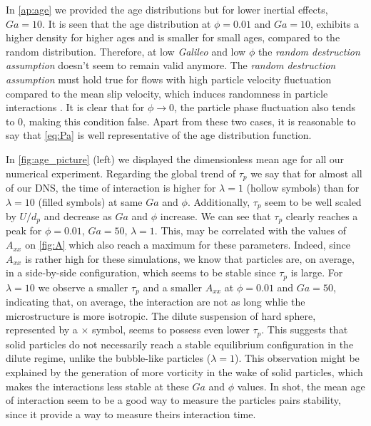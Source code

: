 In \ref{ap:age}  we provided the age distributions but for lower inertial effects, $Ga = 10$. 
It is seen that the age distribution at $\phi = 0.01$ and $Ga = 10$, exhibits a higher density for higher ages and is smaller for small ages, compared to the random distribution.
Therefore, at low \textit{Galileo} and low $\phi$ the \textit{random destruction assumption} doesn't seem to remain valid anymore. 
The \textit{random destruction assumption} must hold true for flows with high particle velocity fluctuation compared to the mean slip velocity, which induces randomness in particle interactions \citep{zhang2023evolution}. 
It is clear that for $\phi \rightarrow 0$, the particle phase fluctuation also tends to $0$, making this condition false. 
Apart from these two cases, it is reasonable to say that \ref{eq:Pa} is well representative of the age distribution function.

In \ref{fig:age_picture} (left) we displayed the dimensionless mean age for all our numerical experiment. 
Regarding the global trend of $\tau_p$ we say that for almost all of our DNS, the time of interaction is higher for $\lambda = 1$ (hollow symbols) than for $\lambda = 10$ (filled symbols) at same $Ga$ and $\phi$.
Additionally,  $\tau_p$ seem to be well scaled by $U/d_p$ and decrease as $Ga$ and $\phi$ increase. 
We can see that $\tau_p$ clearly reaches a peak for $\phi=0.01$, $Ga=50$, $\lambda=1$.
This, may be correlated with the values of $A_{xx}$ on \ref{fig:A} which also reach a maximum for these parameters. 
Indeed, since $A_{xx}$ is rather high for these simulations, we know that particles are, on average, in a side-by-side configuration, which seems to be stable since $\tau_p$ is large.
For $\lambda = 10$ we observe a smaller $\tau_p$ and a smaller $A_{xx}$ at $\phi = 0.01$ and $Ga = 50$, indicating that, on average, the interaction are not as long whlie the microstructure is more isotropic. 
The dilute suspension of hard sphere, represented by a $\pmb\times$ symbol, seems to possess even lower $\tau_p$. 
This suggests that solid particles do not necessarily reach a stable equilibrium configuration in the dilute regime, unlike the bubble-like particles ($\lambda = 1$). 
This observation might be explained by the generation of more vorticity in the wake of solid particles, which makes the interactions less stable at these $Ga$ and $\phi$ values. 
In shot, the mean age of interaction seem to be a good way to measure the particles pairs stability, since it provide a way to measure theirs interaction time. 

